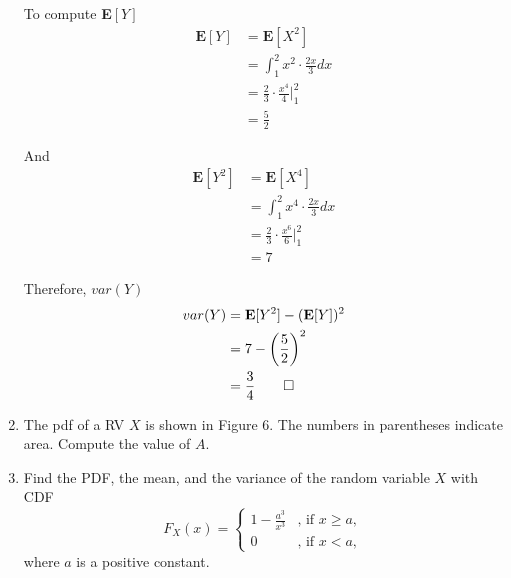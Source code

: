 \documentclass[paper=usletter, fontsize=12pt]{article}
\begin{document}
\begin{enumerate}
\begin{cproof}
            To compute \textbf{E}$[Y]$
            \begin{align*}
                \textbf{E}[Y] & = \textbf{E}[X^2] \\
                & = \int_{1}^{2}x^2\cdot\frac{2x}{3}dx \\
                & = \frac{2}{3}\cdot\frac{x^4}{4}\bigg\vert_1^2\\
                & = \frac{5}{2}
            \end{align*}
            \endgroup

            And
            \begin{align*}
                \textbf{E}[Y^2] & = \textbf{E}[X^4] \\
                & = \int_{1}^{2}x^4\cdot\frac{2x}{3}dx \\
                & = \frac{2}{3}\cdot\frac{x^6}{6}\bigg\vert_1^2\\
                & = 7
            \end{align*}
            \endgroup

            Therefore, $var(Y)$
            \begin{align*}
                var(Y) & = \textbf{E}[Y^2] - (\textbf{E}[Y])^2 \\
                & = 7 - \bigg(\frac{5}{2}\bigg)^2 \\
                & = \frac{3}{4} \qedhere
            \end{align*}
            \endgroup

        \end{cproof}

        \item The pdf of a RV $X$ is shown in Figure 6. The numbers in
        parentheses indicate area. Compute the value of $A$.
        \begin{cproof}
        \end{cproof}

        \item Find the PDF, the mean, and the variance of the random variable
        $X$ with CDF
        \begin{equation*}
            F_X(x) = \begin{cases}
                1-\frac{a^3}{x^3} & \text{, if } x \ge a,\\
                0 & \text{, if } x < a,
            \end{cases}
        \end{equation*}
        \endgroup
        where $a$ is a positive constant.
        \begin{cproof}
        \end{cproof}


\end{enumerate}
\end{document}

